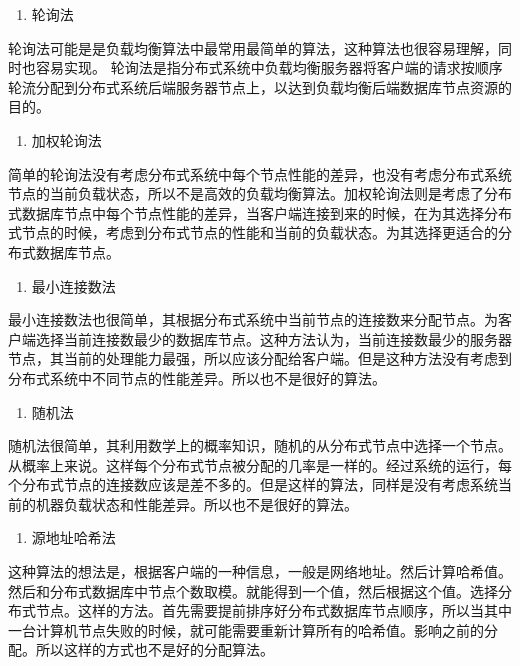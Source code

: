 	\begin{enumerate}
		\item 轮询法
	\end{enumerate}

	轮询法可能是是负载均衡算法中最常用最简单的算法，这种算法也很容易理解，同时也容易实现。 
	轮询法是指分布式系统中负载均衡服务器将客户端的请求按顺序
	轮流分配到分布式系统后端服务器节点上，以达到负载均衡后端数据库节点资源的目的。 	

\begin{enumerate}[resume]
	\item 加权轮询法
\end{enumerate}

	简单的轮询法没有考虑分布式系统中每个节点性能的差异，也没有考虑分布式系统节点的当前负载状态，所以不是高效的负载均衡算法。加权轮询法则是考虑了分布式数据库节点中每个节点性能的差异，当客户端连接到来的时候，在为其选择分布式节点的时候，考虑到分布式节点的性能和当前的负载状态。为其选择更适合的分布式数据库节点。

\begin{enumerate}[resume]
	\item 最小连接数法
\end{enumerate}

	最小连接数法也很简单，其根据分布式系统中当前节点的连接数来分配节点。为客户端选择当前连接数最少的数据库节点。这种方法认为，当前连接数最少的服务器节点，其当前的处理能力最强，所以应该分配给客户端。但是这种方法没有考虑到分布式系统中不同节点的性能差异。所以也不是很好的算法。

\begin{enumerate}[resume]
	\item 随机法
\end{enumerate}

	随机法很简单，其利用数学上的概率知识，随机的从分布式节点中选择一个节点。从概率上来说。这样每个分布式节点被分配的几率是一样的。经过系统的运行，每个分布式节点的连接数应该是差不多的。但是这样的算法，同样是没有考虑系统当前的机器负载状态和性能差异。所以也不是很好的算法。
\begin{enumerate}[resume]
	\item 源地址哈希法
\end{enumerate}

	这种算法的想法是，根据客户端的一种信息，一般是网络地址。然后计算哈希值。然后和分布式数据库中节点个数取模。就能得到一个值，然后根据这个值。选择分布式节点。这样的方法。首先需要提前排序好分布式数据库节点顺序，所以当其中一台计算机节点失败的时候，就可能需要重新计算所有的哈希值。影响之前的分配。所以这样的方式也不是好的分配算法。
	
